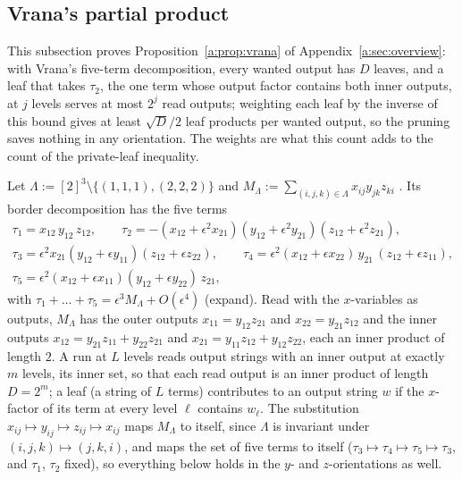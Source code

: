 \documentclass[11pt]{article}
\theoremstyle{definition}
\theoremstyle{remark}
\begin{document}
\subsection{Vrana's partial product}\label{a:sec:vrana}

This subsection proves Proposition~\ref{a:prop:vrana} of Appendix~\ref{a:sec:overview}: with Vrana's five-term decomposition, every wanted output has $D$ leaves, and a leaf that takes $\tau_2$, the one term whose output factor contains both inner outputs, at $j$ levels serves at most $2^j$ read outputs; weighting each leaf by the inverse of this bound gives at least $\sqrt D/2$ leaf products per wanted output, so the pruning saves nothing in any orientation. The weights are what this count adds to the count of the private-leaf inequality.

Let $\Lambda:=[2]^3\setminus\{(1,1,1),(2,2,2)\}$ and $M_\Lambda:=\sum_{(i,j,k)\in\Lambda}x_{ij}y_{jk}z_{ki}$ \cite[Example 4.10]{Vra24}. Its border decomposition \cite[eq.~(42)]{Vra24} has the five terms
\begin{gather*}
\tau_1=x_{12}\,y_{12}\,z_{12},\qquad \tau_2=-(x_{12}+\epsilon^2x_{21})(y_{12}+\epsilon^2y_{21})(z_{12}+\epsilon^2z_{21}),\\
\tau_3=\epsilon^2x_{21}(y_{12}+\epsilon y_{11})(z_{12}+\epsilon z_{22}),\qquad \tau_4=\epsilon^2(x_{12}+\epsilon x_{22})\,y_{21}\,(z_{12}+\epsilon z_{11}),\qquad \\ \tau_5=\epsilon^2(x_{12}+\epsilon x_{11})(y_{12}+\epsilon y_{22})\,z_{21},
\end{gather*}
with $\tau_1+\dots+\tau_5=\epsilon^3M_\Lambda+O(\epsilon^4)$ (expand). Read with the $x$-variables as outputs, $M_\Lambda$ has the outer outputs $x_{11}=y_{12}z_{21}$ and $x_{22}=y_{21}z_{12}$ and the inner outputs $x_{12}=y_{21}z_{11}+y_{22}z_{21}$ and $x_{21}=y_{11}z_{12}+y_{12}z_{22}$, each an inner product of length $2$. A run at $L$ levels reads output strings with an inner output at exactly $m$ levels, its inner set, so that each read output is an inner product of length $D=2^m$; a leaf (a string of $L$ terms) contributes to an output string $w$ if the $x$-factor of its term at every level $\ell$ contains $w_\ell$. The substitution $x_{ij}\mapsto y_{ij}\mapsto z_{ij}\mapsto x_{ij}$ maps $M_\Lambda$ to itself, since $\Lambda$ is invariant under $(i,j,k)\mapsto(j,k,i)$, and maps the set of five terms to itself ($\tau_3\mapsto\tau_4\mapsto\tau_5\mapsto\tau_3$, and $\tau_1$, $\tau_2$ fixed), so everything below holds in the $y$- and $z$-orientations as well.
\end{document}
